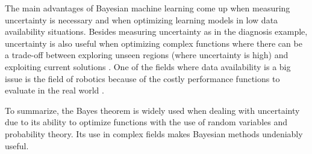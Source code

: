The main advantages of Bayesian machine learning come up when measuring uncertainty is necessary and when optimizing learning models in low data availability situations. Besides measuring uncertainty as in the diagnosis example, uncertainty is also useful when optimizing complex functions where there can be a trade-off between exploring unseen regions (where uncertainty is high) and exploiting current solutions \parencite{Luke2013Metaheuristics}. One of the fields where data availability is a big issue is the field of robotics because of the costly performance functions to evaluate in the real world \parencite{shahriari2015taking}. 

To summarize, the Bayes theorem is widely used when dealing with uncertainty due to its ability to optimize functions with the use of random variables and probability theory. Its use in complex fields makes Bayesian methods undeniably useful.









\printbibliography



